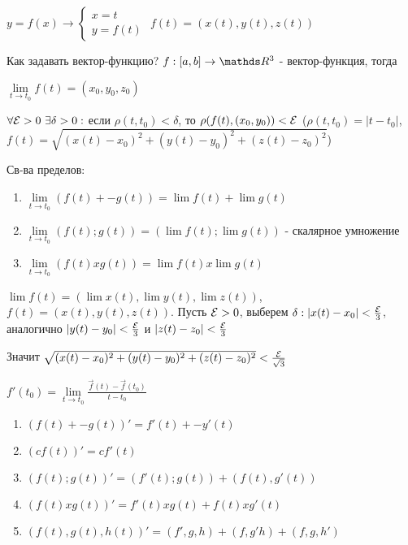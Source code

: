 \documentclass[11pt]{article}
\begin{document}
$y=f(x) \rightarrow \begin{cases} x=t\\ y=f(t) \end{cases}$
$f(t)=(x(t),y(t),z(t))$

Как задавать вектор-функцию? $f:[a,b] \rightarrow \R^3$ - вектор-функция, тогда 

$\lim\limits_{t \rightarrow t_0} f(t) = (x_0, y_0, z_0)$

$\forall \mathcal{E}>0\ \exists \delta>0:$ если $\rho (t,t_0) < \delta$, то $\rho(f(t),(x_0,y_0))<\mathcal{E}$ ($\rho (t,t_0) = |t-t_0|$, $f(t)=\sqrt{(x(t)-x_0)^2+(y(t)-y_0)^2+(z(t)-z_0)^2}$)

Св-ва пределов:
\begin{enumerate}
    \item $\lim\limits_{t \rightarrow t_0} (f(t) +- g(t)) = \lim f(t) + \lim g(t)$
    \item $\lim\limits_{t \rightarrow t_0} (f(t);g(t)) = (\lim f(t); \lim g(t))$ - скалярное умножение
    \item $\lim\limits_{t \rightarrow t_0} (f(t) x g(t)) = \lim f(t) x \lim g(t)$
\end{enumerate}

\begin{proofs}
    $\lim f(t)=(\lim x(t), \lim y(t), \lim z(t))$, $f(t)=(x(t), y(t), z(t))$. Пусть $\mathcal{E}>0$, выберем $\delta: |x(t)-x_0|< \frac{\mathcal{E}}{3}$, аналогично $|y(t)-y_0|<\frac{\mathcal{E}}{3}$ и $|z(t)-z_0|<\frac{\mathcal{E}}{3}$
    
    Значит $\sqrt{(x(t)-x_0)^2+(y(t)-y_0)^2+(z(t)-z_0)^2} < \frac{\mathcal{E}}{\sqrt{3}}$
\end{proofs}

\begin{definition}
    $f'(t_0)=\lim\limits_{t \rightarrow t_0} \frac{\overrightarrow{f}(t)-\overrightarrow{f}(t_0)}{t-t_0}$
\end{definition}

\begin{properties2}{}
    \begin{enumerate}
        \item $(f(t)+-g(t))'=f'(t)+-y'(t)$
        \item $(c f(t))'=c f'(t)$
        \item $(f(t);g(t))'=(f'(t);g(t))+(f(t),g'(t))$
        \item $(f(t) x g(t))' = f'(t) x g(t) + f(t) x g'(t)$
        \item $(f(t),g(t),h(t))'=(f',g,h)+(f,g'h)+(f,g,h')$
    \end{enumerate}
\end{properties2}
\end{document}

